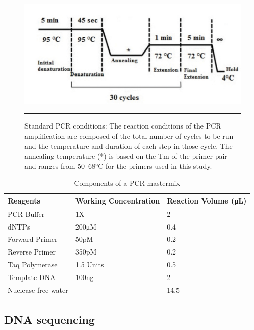 \begin{refsection}
\begin{figure}[!tb]
\centering
\includegraphics[width=\linewidth]{Figures/2_6pcrconditions.pdf} 
\rule{35em}{0.5pt}
\caption[Standard PCR conditions]{Standard PCR conditions: The reaction conditions of the PCR amplification are composed of the total number of cycles to be run and the temperature and duration of each step in those cycle. The annealing temperature (*) is based on the Tm of the primer pair and ranges from 50–68°C for the primers used in this study. \cite{Cabuk2007, deeparani2009detection, galbiatti20105, zeng2011a66g, goldmuntz2001nkx2}}
\label{fig:2_6pcrconditions}
\end{figure}

\begin{table}[!h]
\centering
\caption[Components of a PCR mastermix]{Components of a PCR mastermix}
\label{tab:2.2pcrmm}
\begin{tabular}{  p{1.5in}  P{1.5in}  P{1in}  }
\toprule
	\textbf{Reagents} & \textbf{Working Concentration} & \textbf{Reaction Volume (μL)} \\ \toprule
	PCR Buffer & 1X & 2 \\ \midrule
	dNTPs & 200μM & 0.4 \\ \midrule
	Forward Primer & 50pM & 0.2 \\ \midrule
	Reverse Primer & 350pM & 0.2 \\ \midrule
	Taq Polymerase & 1.5 Units & 0.5 \\ \midrule
	Template DNA & 100ng & 2 \\ \midrule
	Nuclease-free water & - & 14.5 \\ \bottomrule
\end{tabular}
\end{table}

\subsection{DNA sequencing} \label{sequencing}


\end{refsection}
